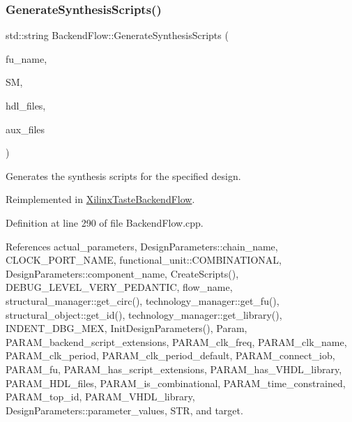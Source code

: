 \subsubsection{\texorpdfstring{Generate\+Synthesis\+Scripts()}{GenerateSynthesisScripts()}}
{\footnotesize\ttfamily std\+::string Backend\+Flow\+::\+Generate\+Synthesis\+Scripts (\begin{DoxyParamCaption}\item[{const std\+::string \&}]{fu\+\_\+name,  }\item[{const \hyperlink{structural__manager_8hpp_ab3136f0e785d8535f8d252a7b53db5b5}{structural\+\_\+manager\+Ref}}]{SM,  }\item[{const std\+::list$<$ std\+::string $>$ \&}]{hdl\+\_\+files,  }\item[{const std\+::list$<$ std\+::string $>$ \&}]{aux\+\_\+files }\end{DoxyParamCaption})\hspace{0.3cm}{\ttfamily [virtual]}}



Generates the synthesis scripts for the specified design. 



Reimplemented in \hyperlink{classXilinxTasteBackendFlow_a8f8760e798f045aaad6cc3b56a00e627}{Xilinx\+Taste\+Backend\+Flow}.



Definition at line 290 of file Backend\+Flow.\+cpp.



References actual\+\_\+parameters, Design\+Parameters\+::chain\+\_\+name, C\+L\+O\+C\+K\+\_\+\+P\+O\+R\+T\+\_\+\+N\+A\+ME, functional\+\_\+unit\+::\+C\+O\+M\+B\+I\+N\+A\+T\+I\+O\+N\+AL, Design\+Parameters\+::component\+\_\+name, Create\+Scripts(), D\+E\+B\+U\+G\+\_\+\+L\+E\+V\+E\+L\+\_\+\+V\+E\+R\+Y\+\_\+\+P\+E\+D\+A\+N\+T\+IC, flow\+\_\+name, structural\+\_\+manager\+::get\+\_\+circ(), technology\+\_\+manager\+::get\+\_\+fu(), structural\+\_\+object\+::get\+\_\+id(), technology\+\_\+manager\+::get\+\_\+library(), I\+N\+D\+E\+N\+T\+\_\+\+D\+B\+G\+\_\+\+M\+EX, Init\+Design\+Parameters(), Param, P\+A\+R\+A\+M\+\_\+backend\+\_\+script\+\_\+extensions, P\+A\+R\+A\+M\+\_\+clk\+\_\+freq, P\+A\+R\+A\+M\+\_\+clk\+\_\+name, P\+A\+R\+A\+M\+\_\+clk\+\_\+period, P\+A\+R\+A\+M\+\_\+clk\+\_\+period\+\_\+default, P\+A\+R\+A\+M\+\_\+connect\+\_\+iob, P\+A\+R\+A\+M\+\_\+fu, P\+A\+R\+A\+M\+\_\+has\+\_\+script\+\_\+extensions, P\+A\+R\+A\+M\+\_\+has\+\_\+\+V\+H\+D\+L\+\_\+library, P\+A\+R\+A\+M\+\_\+\+H\+D\+L\+\_\+files, P\+A\+R\+A\+M\+\_\+is\+\_\+combinational, P\+A\+R\+A\+M\+\_\+time\+\_\+constrained, P\+A\+R\+A\+M\+\_\+top\+\_\+id, P\+A\+R\+A\+M\+\_\+\+V\+H\+D\+L\+\_\+library, Design\+Parameters\+::parameter\+\_\+values, S\+TR, and target.



